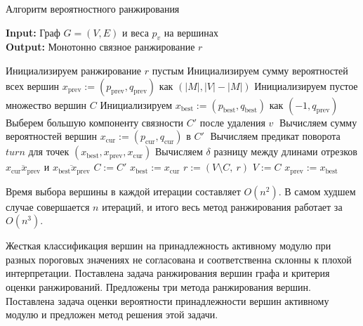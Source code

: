 \begin{algorithm}
    \caption{Алгоритм вероятностного ранжирования}
    \label{alg:mcmc}
    \hspace*{\algorithmicindent} \textbf{Input:}  Граф $G=(V, E)$ и веса $p_v$ на вершинах\\
    \hspace*{\algorithmicindent} \textbf{Output:} Монотонно связное ранжирование $r$
    \begin{algorithmic}[1]
        \State Инициализируем ранжирование $r$ пустым
        \State Инициализируем сумму вероятностей всех вершин
        $x_{\text{prev}} := (p_{\text{prev}}, q_{\text{prev}})$ как $(|M|, |V| - |M|)$
            \State Инициализируем пустое множество вершин $C$
            \State Инициализируем $x_{\text{best}} := (p_{\text{best}}, q_{\text{best}})$ как $(-1, q_{\text{prev}})$
                \State Выберем большую компоненту связности $C'$ после удаления $v\;$
                \State Вычисляем сумму вероятностей вершин
                    $x_{\text{cur}} := (p_{\text{cur}}, q_{\text{cur}})$ в $C'\;$
                \State Вычисляем предикат поворота $turn$ для точек
                    $(x_{\text{best}}, x_{\text{prev}}, x_{\text{cur}})$
                \State Вычисляем $\delta$ разницу между длинами отрезков
                $\overline{x_{\text{cur}}x_{\text{prev}}}$ и $\overline{x_{\text{best}}x_{\text{prev}}}$
                    \State $C := C'$
                    \State $x_{\text{best}} := x_{\text{cur}}$
                \EndIf
            \EndFor
            \State $r := (V \setminus C,~r)$
            \State $V := C$
            \State $x_{\text{prev}} := x_{\text{best}}$
        \EndWhile
    \end{algorithmic}
\end{algorithm}

Время выбора вершины в каждой итерации составляет $O(n^2)$.  В самом худшем
случае совершается $n$ итераций, и итого весь метод ранжирования работает за
$O(n^3)$.

\chapterconclusion
Жесткая классификация вершин на принадлежность активному модулю при разных
пороговых значениях не согласована и соответственна склонны к плохой
интерпретации.  Поставлена задача ранжирования вершин графа и критерия оценки
ранжирований. Предложены три метода ранжирования вершин.  Поставлена задача
оценки вероятности принадлежности вершин активному модулю и предложен метод
решения этой задачи.
